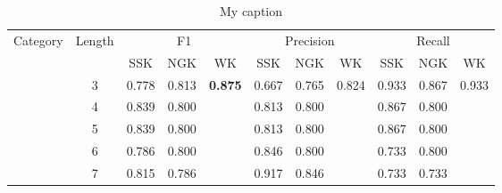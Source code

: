 \begin{table}[]
\centering
\caption{My caption}
\label{my-label}
\begin{tabular}{|c|c|c|c|c|c|c|c|c|c|c|}
\hline
Category                & Length                & \multicolumn{3}{c|}{F1}                                                                                                  & \multicolumn{3}{c|}{Precision} & \multicolumn{3}{c|}{Recall}                                                                   \\ \cline{3-11} 
\multicolumn{1}{|l|}{}  & \multicolumn{1}{l|}{} & SSK                                    & NGK                                    & WK                                     & SSK      & NGK      & WK       & SSK                           & NGK                           & WK                            \\ \hline
                        & 3                     & \cellcolor[HTML]{EFEFEF}0.778          & \cellcolor[HTML]{EFEFEF}0.813          & \cellcolor[HTML]{EFEFEF}\textbf{0.875} & 0.667    & 0.765    & 0.824    & \cellcolor[HTML]{EFEFEF}0.933 & \cellcolor[HTML]{EFEFEF}0.867 & \cellcolor[HTML]{EFEFEF}0.933 \\ \cline{2-11} 
                        & 4                     & \cellcolor[HTML]{EFEFEF}0.839          & \cellcolor[HTML]{EFEFEF}0.800          & \cellcolor[HTML]{EFEFEF}               & 0.813    & 0.800    &          & \cellcolor[HTML]{EFEFEF}0.867 & \cellcolor[HTML]{EFEFEF}0.800 & \cellcolor[HTML]{EFEFEF}      \\ \cline{2-11} 
                        & 5                     & \cellcolor[HTML]{EFEFEF}0.839          & \cellcolor[HTML]{EFEFEF}0.800          & \cellcolor[HTML]{EFEFEF}               & 0.813    & 0.800    &          & \cellcolor[HTML]{EFEFEF}0.867 & \cellcolor[HTML]{EFEFEF}0.800 & \cellcolor[HTML]{EFEFEF}      \\ \cline{2-11} 
                        & 6                     & \cellcolor[HTML]{EFEFEF}0.786          & \cellcolor[HTML]{EFEFEF}0.800          & \cellcolor[HTML]{EFEFEF}               & 0.846    & 0.800    &          & \cellcolor[HTML]{EFEFEF}0.733 & \cellcolor[HTML]{EFEFEF}0.800 & \cellcolor[HTML]{EFEFEF}      \\ \cline{2-11} 
                        & 7                     & \cellcolor[HTML]{EFEFEF}0.815          & \cellcolor[HTML]{EFEFEF}0.786          & \cellcolor[HTML]{EFEFEF}               & 0.917    & 0.846    &          & \cellcolor[HTML]{EFEFEF}0.733 & \cellcolor[HTML]{EFEFEF}0.733 & \cellcolor[HTML]{EFEFEF}      \\ \cline{2-11} 

\end{tabular}
\end{table}

